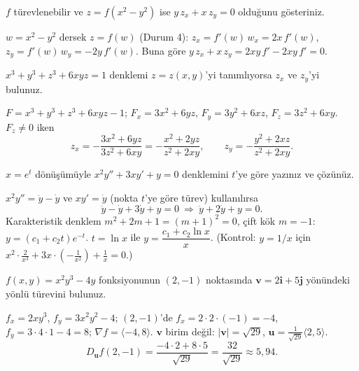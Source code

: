 \begin{soru}
$f$ türevlenebilir ve $z=f(x^2-y^2)$ ise $y\,z_x+x\,z_y=0$ olduğunu gösteriniz.
\end{soru}
\begin{cevap}
$w=x^2-y^2$ dersek $z=f(w)$ (Durum 4): $z_x=f'(w)\,w_x=2x\,f'(w)$, $z_y=f'(w)\,w_y=-2y\,f'(w)$. Buna göre
$y\,z_x+x\,z_y=2xy\,f'-2xy\,f'=0$.
\end{cevap}

\begin{soru}
$x^3+y^3+z^3+6xyz=1$ denklemi $z=z(x,y)$'yi tanımlıyorsa $z_x$ ve $z_y$'yi bulunuz.
\end{soru}
\begin{cevap}
$F=x^3+y^3+z^3+6xyz-1$; $F_x=3x^2+6yz$, $F_y=3y^2+6xz$, $F_z=3z^2+6xy$. $F_z\ne0$ iken
\[
z_x=-\frac{3x^2+6yz}{3z^2+6xy}=-\frac{x^2+2yz}{z^2+2xy},\qquad z_y=-\frac{y^2+2xz}{z^2+2xy}.
\]
\end{cevap}

\begin{soru}
$x=e^t$ dönüşümüyle $x^2y''+3xy'+y=0$ denklemini $t$'ye göre yazınız ve çözünüz.
\end{soru}
\begin{cevap}
$x^2y''=\ddot y-\dot y$ ve $xy'=\dot y$ (nokta $t$'ye göre türev) kullanılırsa
\[
\ddot y-\dot y+3\dot y+y=0\ \Longrightarrow\ \ddot y+2\dot y+y=0 .
\]
Karakteristik denklem $m^2+2m+1=(m+1)^2=0$, çift kök $m=-1$: $y=(c_1+c_2t)e^{-t}$. $t=\ln x$ ile
$y=\dfrac{c_1+c_2\ln x}{x}$. (Kontrol: $y=1/x$ için $x^2\cdot\frac{2}{x^3}+3x\cdot\left(-\frac{1}{x^2}\right)+\frac1x=0$.)
\end{cevap}

\begin{soru}
$f(x,y)=x^2y^3-4y$ fonksiyonunun $(2,-1)$ noktasında $\mathbf v=2\mathbf i+5\mathbf j$ yönündeki yönlü türevini bulunuz.
\end{soru}
\begin{cevap}
$f_x=2xy^3$, $f_y=3x^2y^2-4$; $(2,-1)$'de $f_x=2\cdot2\cdot(-1)=-4$, $f_y=3\cdot4\cdot1-4=8$; $\nabla f=\langle-4,8\rangle$.
$\mathbf v$ birim değil: $|\mathbf v|=\sqrt{29}$, $\mathbf u=\frac{1}{\sqrt{29}}\langle2,5\rangle$.
\[
D_{\mathbf u}f(2,-1)=\frac{-4\cdot2+8\cdot5}{\sqrt{29}}=\boxed{\frac{32}{\sqrt{29}}}\approx5{,}94 .
\]
\end{cevap}

